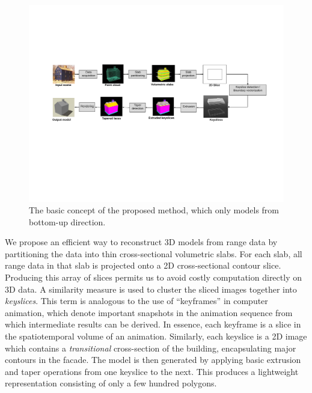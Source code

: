 \documentclass[10pt,journal,cspaper,compsoc]{IEEEtran}
\begin{document}
\begin{figure}[htbp]
\begin{center}
\includegraphics[width=7in]{overview.pdf}
\end{center}
\caption{The basic concept of the proposed method, which only models from bottom-up direction.}
\label{fig:ov}
\end{figure}

We propose an efficient way to reconstruct 3D models from range data by
partitioning the data into thin cross-sectional volumetric slabs.
For each slab, all range data in that slab is projected onto a 2D
cross-sectional contour slice.
Producing this array of slices permits us to avoid costly computation directly
on 3D data.
A similarity measure is used to cluster the sliced images
together into {\it keyslices}.
This term is analogous to the use of ``keyframes'' in computer animation,
which denote important snapshots in the animation sequence from which
intermediate results can be derived.
In essence, each keyframe is a slice in the spatiotemporal volume of
an animation.
Similarly, each keyslice is a 2D image which contains a {\it transitional}
cross-section of the building, encapsulating major contours in the facade.
The model is then generated by applying basic extrusion and taper
operations from one keyslice to the next.
This produces a lightweight representation consisting of only a few
hundred polygons.
\end{document}
